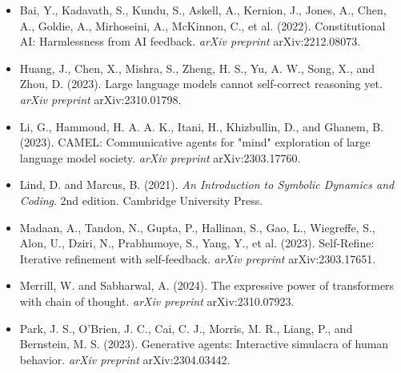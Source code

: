 \begin{itemize}
  \item Bai, Y., Kadavath, S., Kundu, S., Askell, A., Kernion, J., Jones, A., Chen, A., Goldie, A., Mirhoseini, A., McKinnon, C., et al. (2022). Constitutional AI: Harmlessness from AI feedback. \textit{arXiv preprint} arXiv:2212.08073.
\end{itemize}

\begin{itemize}
  \item Huang, J., Chen, X., Mishra, S., Zheng, H. S., Yu, A. W., Song, X., and Zhou, D. (2023). Large language models cannot self-correct reasoning yet. \textit{arXiv preprint} arXiv:2310.01798.
\end{itemize}

\begin{itemize}
  \item Li, G., Hammoud, H. A. A. K., Itani, H., Khizbullin, D., and Ghanem, B. (2023). CAMEL: Communicative agents for "mind" exploration of large language model society. \textit{arXiv preprint} arXiv:2303.17760.
\end{itemize}

\begin{itemize}
  \item Lind, D. and Marcus, B. (2021). \textit{An Introduction to Symbolic Dynamics and Coding}. 2nd edition. Cambridge University Press.
\end{itemize}

\begin{itemize}
  \item Madaan, A., Tandon, N., Gupta, P., Hallinan, S., Gao, L., Wiegreffe, S., Alon, U., Dziri, N., Prabhumoye, S., Yang, Y., et al. (2023). Self-Refine: Iterative refinement with self-feedback. \textit{arXiv preprint} arXiv:2303.17651.
\end{itemize}

\begin{itemize}
  \item Merrill, W. and Sabharwal, A. (2024). The expressive power of transformers with chain of thought. \textit{arXiv preprint} arXiv:2310.07923.
\end{itemize}

\begin{itemize}
  \item Park, J. S., O'Brien, J. C., Cai, C. J., Morris, M. R., Liang, P., and Bernstein, M. S. (2023). Generative agents: Interactive simulacra of human behavior. \textit{arXiv preprint} arXiv:2304.03442.
\end{itemize}

